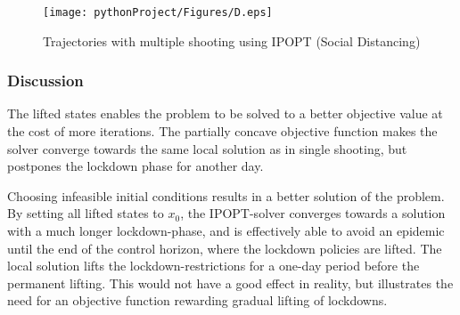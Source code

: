 \begin{figure}[H]
    \centering
    \texttt{[image: pythonProject/Figures/D.eps]}
    \caption{Trajectories with multiple shooting using IPOPT (Social Distancing)}
    \label{fig:MS_Traj_SD_IPOPT}
\end{figure}

\subsubsection{Discussion}
The lifted states enables the problem to be solved to a better objective value at the cost of more iterations. The partially concave objective function makes the solver converge towards the same local solution as in single shooting, but postpones the lockdown phase for another day.

Choosing infeasible initial conditions results in a better solution of the problem. By setting all lifted states to $x_0$, the IPOPT-solver converges towards a solution with a much longer lockdown-phase, and is effectively able to avoid an epidemic until the end of the control horizon, where the lockdown policies are lifted. The local solution lifts the lockdown-restrictions for a one-day period before the permanent lifting. This would not have a good effect in reality, but illustrates the need for an objective function rewarding gradual lifting of lockdowns. 


